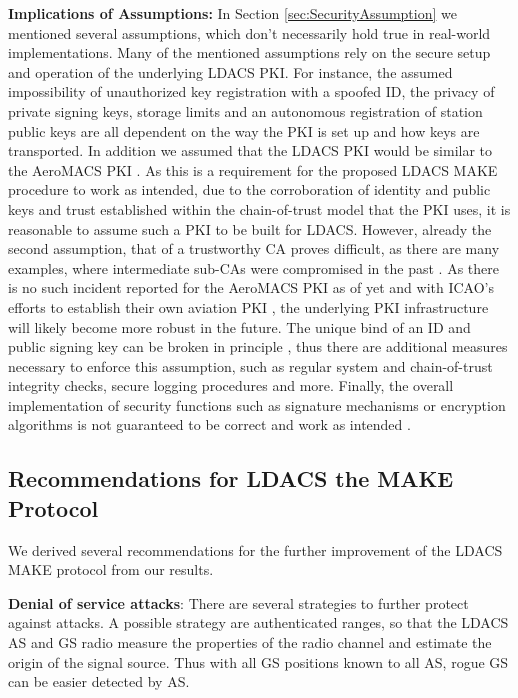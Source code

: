 \textbf{Implications of Assumptions:}
In Section \ref{sec:SecurityAssumption} we mentioned several assumptions, which don't necessarily hold true in real-world implementations. Many of the mentioned assumptions rely on the secure setup and operation of the underlying LDACS PKI. For instance, the assumed impossibility of unauthorized key registration with a spoofed ID, the privacy of private signing keys, storage limits and an autonomous registration of station public keys are all dependent on the way the PKI is set up and how keys are transported. In addition we assumed that  the \ac{LDACS} \ac{PKI} would be similar to the \ac{AeroMACS} PKI \cite{crowe2017}. As this is a requirement for the proposed LDACS MAKE procedure to work as intended, due to the corroboration of identity and public keys and trust established within the chain-of-trust model that the PKI uses, it is reasonable to assume such a PKI to be built for LDACS. However, already the second assumption, that of a trustworthy \ac{CA} proves difficult, as there are many examples, where intermediate sub-CAs were compromised in the past \cite{roosa2013}. As there is no such incident reported for the AeroMACS PKI as of yet and with \ac{ICAO}'s efforts to establish their own aviation PKI \cite{patel2016}, the underlying PKI infrastructure will likely become more robust in the future. The unique bind of an ID and public signing key can be broken in principle \cite{cohn2016}, thus there are additional measures necessary to enforce this assumption, such as regular system and chain-of-trust integrity checks, secure logging procedures and more. Finally, the overall implementation of security functions such as signature mechanisms or encryption algorithms is not guaranteed to be correct and work as intended \cite{aumasson2017}.

\subsection{Recommendations for LDACS the MAKE Protocol}
We derived several recommendations for the further improvement of the \ac{LDACS} \ac{MAKE} protocol from our results.

\vspace{0.5em}
\textbf{Denial of service attacks}:
There are several strategies to further protect against attacks. A possible strategy are authenticated ranges, so that the LDACS AS and GS radio measure the properties of the radio channel and estimate the origin of the signal source. Thus with all GS positions known to all AS, rogue GS can be easier detected by AS. 

